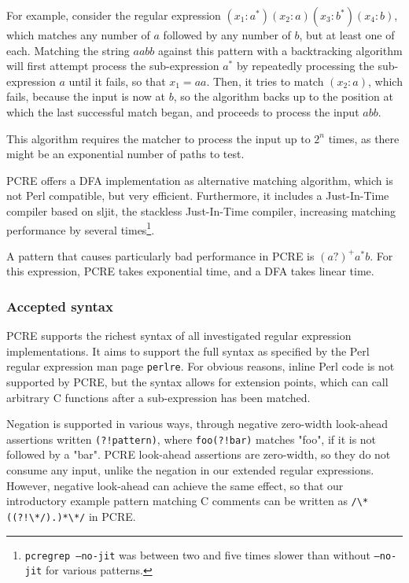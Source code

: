For example, consider the regular expression $(x_1:a^*)(x_2:a)(x_3:b^*)(x_4:b)$,
which matches any number of $a$ followed by any number of $b$, but at least one
of each. Matching the string $aabb$ against this pattern with a backtracking
algorithm will first attempt process the sub-expression $a^*$ by repeatedly
processing the sub-expression $a$ until it fails, so that $x_1 = aa$. Then, it
tries to match $(x_2:a)$, which fails, because the input is now at $b$, so the
algorithm backs up to the position at which the last successful match began, and
proceeds to process the input $abb$.

This algorithm requires the matcher to process the input up to $2^n$ times, as
there might be an exponential number of paths to test.

PCRE offers a DFA implementation as alternative matching algorithm, which is not
Perl compatible, but very efficient. Furthermore, it includes a Just-In-Time
compiler based on sljit, the stackless Just-In-Time compiler, increasing
matching performance by several times\footnote{\texttt{pcregrep --no-jit} was
between two and five times slower than without \texttt{--no-jit} for various
patterns.}.

A pattern that causes particularly bad performance in PCRE is $(a?)^+a^*b$. For
this expression, PCRE takes exponential time, and a DFA takes linear time.


\subsubsection{Accepted syntax}

PCRE supports the richest syntax of all investigated regular expression
implementations. It aims to support the full syntax as specified by the Perl
regular expression man page \texttt{perlre}. For obvious reasons, inline Perl
code is not supported by PCRE, but the syntax allows for extension points, which
can call arbitrary C functions after a sub-expression has been matched.

Negation is supported in various ways, through negative zero-width look-ahead
assertions written \verb'(?!pattern)', where \verb'foo(?!bar)' matches "foo", if
it is not followed by a "bar". PCRE look-ahead assertions are zero-width, so
they do not consume any input, unlike the negation in our extended regular
expressions. However, negative look-ahead can achieve the same effect, so that
our introductory example pattern matching C comments can be written as
\verb'/\*((?!\*/).)*\*/' in PCRE.

